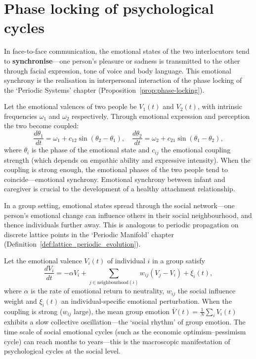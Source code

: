 \section{Phase locking of psychological cycles}

\begin{definition}\label{def:emotional_synchrony}
In face-to-face communication, the emotional states of the two interlocutors tend to \textbf{synchronise}---one person's pleasure or sadness is transmitted to the other through facial expression, tone of voice and body language. This emotional synchrony is the realisation in interpersonal interaction of the phase locking of the `Periodic Systems' chapter (Proposition~\ref{prop:phase-locking}).

Let the emotional valences of two people be $V_1(t)$ and $V_2(t)$, with intrinsic frequencies $\omega_1$ and $\omega_2$ respectively. Through emotional expression and perception the two become coupled:
\[
\frac{d\theta_1}{dt} = \omega_1 + c_{12} \sin(\theta_2 - \theta_1), \quad \frac{d\theta_2}{dt} = \omega_2 + c_{21} \sin(\theta_1 - \theta_2),
\]
where $\theta_i$ is the phase of the emotional state and $c_{ij}$ the emotional coupling strength (which depends on empathic ability and expressive intensity). When the coupling is strong enough, the emotional phases of the two people tend to coincide---emotional synchrony. Emotional synchrony between infant and caregiver is crucial to the development of a healthy attachment relationship.
\end{definition}

\begin{proposition}\label{prop:emotional_contagion}
In a group setting, emotional states spread through the social network---one person's emotional change can influence others in their social neighbourhood, and thence individuals further away. This is analogous to periodic propagation on discrete lattice points in the `Periodic Manifold' chapter (Definition~\ref{def:lattice_periodic_evolution}).

Let the emotional valence $V_i(t)$ of individual $i$ in a group satisfy
\[
\frac{dV_i}{dt} = -\alpha V_i + \sum_{j \in \text{neighbourhood}(i)} w_{ij} (V_j - V_i) + \xi_i(t),
\]
where $\alpha$ is the rate of emotional return to neutrality, $w_{ij}$ the social influence weight and $\xi_i(t)$ an individual-specific emotional perturbation. When the coupling is strong ($w_{ij}$ large), the mean group emotion $\bar{V}(t) = \frac{1}{N}\sum_i V_i(t)$ exhibits a slow collective oscillation---the `social rhythm' of group emotion. The time scale of social emotional cycles (such as the economic optimism--pessimism cycle) can reach months to years---this is the macroscopic manifestation of psychological cycles at the social level.
\end{proposition}

